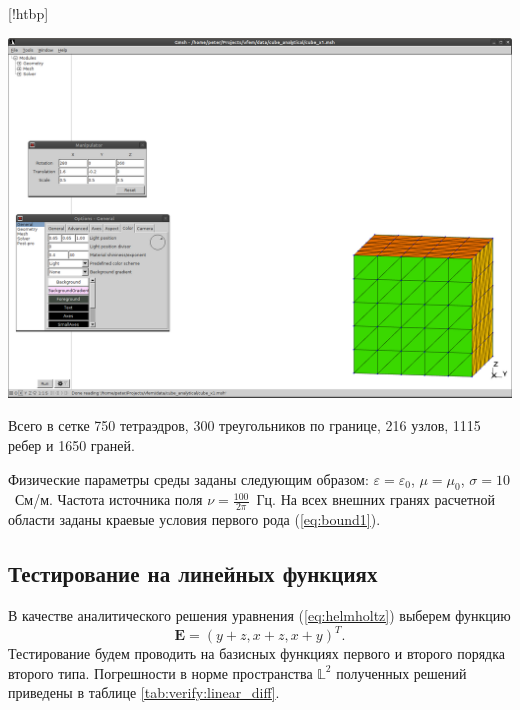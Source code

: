 \documentclass[a4paper,14pt]{article}
\makeatletter
\renewenvironment{figure}[1][\fps@figure]{
  \edef\@tempa{\noexpand\@float{figure}[#1]}
  \@tempa
  \addtocounter{foofigure}{1}
}{
  \end@float
}
\makeatother
\begin{document}
\begin{figure}[!htbp]
	\centering
	\includegraphics[trim=387mm 20mm 5mm 220mm,clip,scale=0.4]{verify/x1.png}
	\caption{конечноэлементная сетка для верификации}
	\label{fig:verify:x1}
\end{figure}

\noindent Всего в сетке 750 тетраэдров, 300 треугольников по границе, 216 узлов, 1115 ребер и 1650 граней.

Физические параметры среды заданы следующим образом: $\varepsilon = \varepsilon_0$, $\mu = \mu_0$, $\sigma = 10$~См/м. Частота источника поля $\nu = \frac{100}{2 \pi}$~Гц. На всех внешних гранях расчетной области заданы краевые условия первого рода (\ref{eq:bound1}).


\subsection{Тестирование на линейных функциях}
В качестве аналитического решения уравнения (\ref{eq:helmholtz}) выберем функцию
\begin{equation*}
	\mathbf{E} = ( y+z , x+z, x+y )^T .
\end{equation*}
Тестирование будем проводить на базисных функциях первого и второго порядка второго типа. Погрешности в норме пространства $\mathbb{L}^2$ полученных решений приведены в таблице \ref{tab:verify:linear_diff}.
\end{document}
